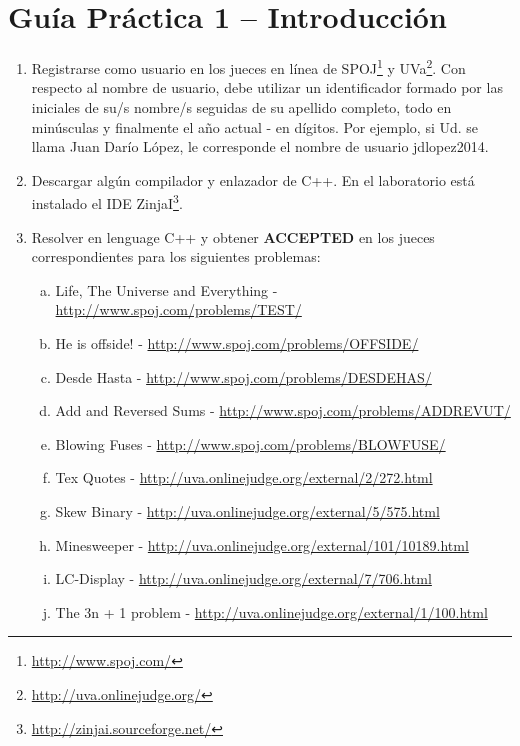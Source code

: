 




\section*{Gu\'ia Pr\'actica 1 -- Introducción}

\begin{enumerate}[1 -]


	\item Registrarse como usuario en los jueces en línea de SPOJ\footnote{\href{http://www.spoj.com/} {http://www.spoj.com/}} y UVa\footnote{\href{http://uva.onlinejudge.org/} {http://uva.onlinejudge.org/}}.
Con respecto al nombre de usuario, debe utilizar un identificador formado por las iniciales de su/s nombre/s seguidas de su apellido completo, todo en minúsculas y finalmente el año actual - en dígitos. Por ejemplo, si Ud. se llama Juan Darío López, le corresponde el nombre de usuario jdlopez2014.

	\item Descargar alg\'un compilador y enlazador de C++. En el laboratorio est\'a instalado el IDE ZinjaI\footnote{\href{http://zinjai.sourceforge.net/} {http://zinjai.sourceforge.net/}}.
	
	\item Resolver en lenguage C++ y obtener \textbf{ACCEPTED} en los jueces correspondientes para los siguientes problemas:
	
	\begin{enumerate}[a)]
	
		\item Life, The Universe and Everything - \href{http://www.spoj.com/problems/TEST/} {http://www.spoj.com/problems/TEST/}
		\item He is offside! - \href{http://www.spoj.com/problems/OFFSIDE/}{http://www.spoj.com/problems/OFFSIDE/}
		\item Desde Hasta - \href{http://www.spoj.com/problems/DESDEHAS/}{http://www.spoj.com/problems/DESDEHAS/}
		\item Add and Reversed Sums - \href{http://www.spoj.com/problems/ADDREVUT/}{http://www.spoj.com/problems/ADDREVUT/} 
		\item Blowing Fuses - \href{http://www.spoj.com/problems/BLOWFUSE/}{http://www.spoj.com/problems/BLOWFUSE/} 
		\item Tex Quotes - \href{http://uva.onlinejudge.org/external/2/272.html}{http://uva.onlinejudge.org/external/2/272.html} 
		\item Skew Binary - \href{http://uva.onlinejudge.org/external/5/575.html}{http://uva.onlinejudge.org/external/5/575.html}
		\item Minesweeper - \href{http://uva.onlinejudge.org/external/101/10189.html}{http://uva.onlinejudge.org/external/101/10189.html} 	
		\item LC-Display - \href{http://uva.onlinejudge.org/external/7/706.html}{http://uva.onlinejudge.org/external/7/706.html} 	
		\item The 3n + 1 problem - \href{http://uva.onlinejudge.org/external/1/100.html}{http://uva.onlinejudge.org/external/1/100.html} 	
	\end{enumerate}
	

\end{enumerate}
